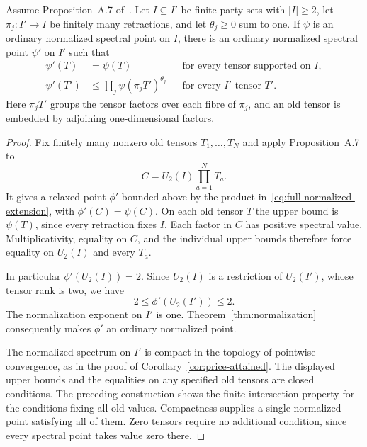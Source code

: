 \begin{proposition}
\label{prop:full-normalized-extension}
Assume Proposition~A.7 of~\cite[page 21]{Anthropic2026}.  Let $I\subseteq I'$ be finite party sets with $|I|\geq2$, let $\pi_j:I'\to I$ be finitely many retractions, and let $\theta_j\geq0$ sum to one.  If $\psi$ is an ordinary normalized spectral point on $I$, there is an ordinary normalized spectral point $\psi'$ on $I'$ such that
\begin{align}
 \psi'(T)&=\psi(T)&&\text{for every tensor supported on }I,\\
 \psi'(T')&\leq\prod_j\psi(\pi_jT')^{\theta_j}
     &&\text{for every }I'\text{-tensor }T'.
 \label{eq:full-normalized-extension}
\end{align}
Here $\pi_jT'$ groups the tensor factors over each fibre of $\pi_j$, and an old tensor is embedded by adjoining one-dimensional factors.
\end{proposition}
\begin{proof}
Fix finitely many nonzero old tensors $T_1,\ldots,T_N$ and apply Proposition~A.7 to
\[
 C=U_2(I)\prod_{a=1}^N T_a.
\]
It gives a relaxed point $\phi'$ bounded above by the product in~\eqref{eq:full-normalized-extension}, with $\phi'(C)=\psi(C)$.  On each old tensor $T$ the upper bound is $\psi(T)$, since every retraction fixes $I$.  Each factor in $C$ has positive spectral value.  Multiplicativity, equality on $C$, and the individual upper bounds therefore force equality on $U_2(I)$ and every $T_a$.

In particular $\phi'(U_2(I))=2$.  Since $U_2(I)$ is a restriction of $U_2(I')$, whose tensor rank is two, we have
\[
 2\leq\phi'(U_2(I'))\leq2.
\]
The normalization exponent on $I'$ is one.  Theorem~\ref{thm:normalization} consequently makes $\phi'$ an ordinary normalized point.

The normalized spectrum on $I'$ is compact in the topology of pointwise convergence, as in the proof of Corollary~\ref{cor:price-attained}.  The displayed upper bounds and the equalities on any specified old tensors are closed conditions.  The preceding construction shows the finite intersection property for the conditions fixing all old values.  Compactness supplies a single normalized point satisfying all of them.  Zero tensors require no additional condition, since every spectral point takes value zero there.
\end{proof}

